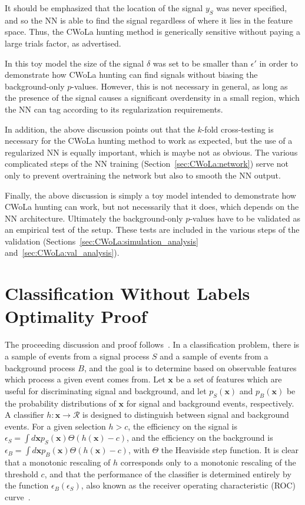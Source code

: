It should be emphasized that the location of the signal $y_S$ was never specified, and so the NN is able to find the signal regardless of where it lies in the feature space.
Thus, the CWoLa hunting method is generically sensitive without paying a large trials factor, as advertised.

In this toy model the size of the signal $\delta$ was set to be smaller than $\epsilon'$ in order to demonstrate how CWoLa hunting can find signals without biasing the background-only $p$-values.
However, this is not necessary in general, as long as the presence of the signal causes a significant overdensity in a small region, which the NN can tag according to its regularization requirements. 

In addition, the above discussion points out that the $k$-fold cross-testing is necessary for the CWoLa hunting method to work as expected, but the use of a regularized NN is equally important, which is maybe not as obvious.
The various complicated steps of the NN training (Section~\ref{sec:CWoLa:network}) serve not only to prevent overtraining the network but also to smooth the NN output.

Finally, the above discussion is simply a toy model intended to demonstrate how CWoLa hunting can work, but not necessarily that it does, which depends on the NN architecture.
Ultimately the background-only $p$-values have to be validated as an empirical test of the setup.
These tests are included in the various steps of the validation (Sections~\ref{sec:CWoLa:simulation_analysis} and~\ref{sec:CWoLa:val_analysis}).

\section{Classification Without Labels Optimality Proof}
\label{app:CWoLa:CWoLa_proof}
The proceeding discussion and proof follows~\cite{Metodiev:2017vrx}.
In a classification problem, there is a sample of events from a signal process $S$ and a sample of events from a background process $B$, and the goal is to determine based on observable features which process a given event comes from.
Let $\mathbf{x}$ be a set of features which are useful for discriminating signal and background, and let $p_S(\mathbf{x})$ and $p_B(\mathbf{x})$ be the probability distributions of $\mathbf{x}$ for signal and background events, respectively.
A classifier $h: \mathbf{x}\rightarrow \mathcal{R}$ is designed to distinguish between signal and background events.
For a given selection $h>c$, the efficiency on the signal is $\epsilon_S = \int d\mathbf{x} p_S(\mathbf{x}) \Theta\left(h(\mathbf{x})-c\right)$, and the efficiency on the background is $\epsilon_B = \int d\mathbf{x} p_B(\mathbf{x}) \Theta\left(h(\mathbf{x})-c\right)$, with $\Theta$ the Heaviside step function.
It is clear that a monotonic rescaling of $h$ corresponds only to a monotonic rescaling of the threshold $c$, and that the performance of the classifier is determined entirely by the function $\epsilon_B(\epsilon_S)$, also known as the receiver operating characteristic (ROC) curve~\cite{egan1975signal}.

